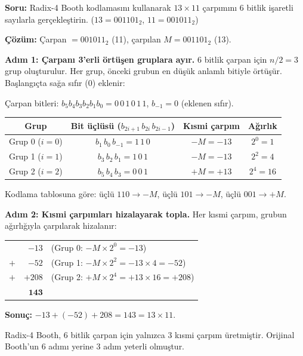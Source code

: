 \begin{ornek}[5.8]
\textbf{Soru:} Radix-4 Booth kodlamasını kullanarak $13 \times 11$ çarpımını 6 bitlik işaretli sayılarla gerçekleştirin. ($13 = 001101_2$, $11 = 001011_2$)

\textbf{Çözüm:} Çarpan $= 001011_2$ (11), çarpılan $M = 001101_2$ (13).

\textbf{Adım 1: Çarpanı 3'erli örtüşen gruplara ayır.} 6 bitlik çarpan için $n/2 = 3$ grup oluşturulur. Her grup, önceki grubun en düşük anlamlı bitiyle örtüşür. Başlangıçta sağa sıfır (0) eklenir:

Çarpan bitleri: $b_5 b_4 b_3 b_2 b_1 b_0 = 0\,0\,1\,0\,1\,1$, $b_{-1} = 0$ (eklenen sıfır).

\begin{center}
\small
\begin{tabular}{c c c c}
\toprule
\textbf{Grup} & \textbf{Bit üçlüsü} ($b_{2i+1}\,b_{2i}\,b_{2i-1}$) & \textbf{Kısmi çarpım} & \textbf{Ağırlık} \\
\midrule
Grup 0 ($i=0$) & $b_1\,b_0\,b_{-1} = 1\,1\,0$ & $-M = -13$ & $2^0 = 1$ \\
Grup 1 ($i=1$) & $b_3\,b_2\,b_1 = 1\,0\,1$ & $-M = -13$ & $2^2 = 4$ \\
Grup 2 ($i=2$) & $b_5\,b_4\,b_3 = 0\,0\,1$ & $+M = +13$ & $2^4 = 16$ \\
\bottomrule
\end{tabular}
\end{center}

Kodlama tablosuna göre: üçlü $110 \to -M$, üçlü $101 \to -M$, üçlü $001 \to +M$.

\textbf{Adım 2: Kısmi çarpımları hizalayarak topla.} Her kısmi çarpım, grubun ağırlığıyla çarpılarak hizalanır:

\begin{center}
\small
\begin{tabular}{r r l}
& $-13$ & (Grup 0: $-M \times 2^0 = -13$) \\
$+$ & $-52$ & (Grup 1: $-M \times 2^2 = -13 \times 4 = -52$) \\
$+$ & $+208$ & (Grup 2: $+M \times 2^4 = +13 \times 16 = +208$) \\
\hline
\multicolumn{2}{r}{$\mathbf{143}$} & \\
\end{tabular}
\end{center}

\textbf{Sonuç:} $-13 + (-52) + 208 = 143 = 13 \times 11$. \checkmark

Radix-4 Booth, 6 bitlik çarpan için yalnızca 3 kısmi çarpım üretmiştir. Orijinal Booth'un 6 adımı yerine 3 adım yeterli olmuştur.
\end{ornek}


